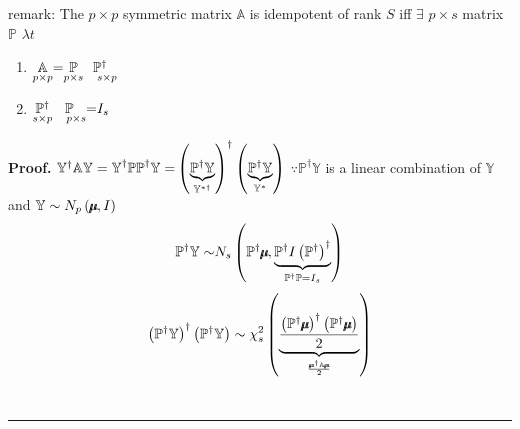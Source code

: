 \documentclass{article}
\newenvironment{proof}[1][Proof]{\noindent\textbf{#1.} }{\ \rule{0.5em}{0.5em}}
\begin{document}
\bigskip

remark: The $p\times p$ symmetric matrix $\mathbb{A}$ is idempotent of rank $%
S$ iff $\exists $ $p\times s$ matrix $\mathbb{P}$ $\lambda t$

\begin{enumerate}
\item $\underset{p\times p}{\mathbb{A}}\mathbb{=}\underset{p\times s}{%
\mathbb{P}}\underset{\quad s\times p}{\mathbb{P}^{\dagger }}$

\item $\underset{s\times p}{\mathbb{P}^{\dagger }}\underset{\quad p\times s}{%
\mathbb{P}}\mathbb{=}I_{s}$
\end{enumerate}

\begin{proof}
$\mathbb{Y}^{\mathbb{\dagger }}\mathbb{AY=Y}^{\mathbb{\dagger }}\mathbb{PP}%
^{\dagger }\mathbb{Y=}\left( \underset{\mathbb{Y}^{\ast \dagger }}{%
\underbrace{\mathbb{P}^{\dagger }\mathbb{Y}}}\right) ^{\dagger }\left( 
\underset{\mathbb{Y}^{\ast }}{\underbrace{\mathbb{P}^{\dagger }\mathbb{Y}}}%
\right) $\newline
\newline
$\because \mathbb{P}^{\dagger }\mathbb{Y}$ is a linear combination of $%
\mathbb{Y}$ and $\mathbb{Y}\sim N_{p}\left( \mathbb{%
\mu\mkern-12.3mu\mu%
},I\right) $%
\begin{equation*}
\therefore \mathbb{P}^{\dagger }\mathbb{Y\sim }N_{s}\left( \mathbb{P}%
^{\dagger }\mathbb{%
\mu\mkern-12.3mu\mu%
},\underset{\mathbb{P}^{\dagger }\mathbb{P}=I_{s}}{\underbrace{\mathbb{P}%
^{\dagger }I\left( \mathbb{P}^{\dagger }\right) ^{\dagger }}}\right) 
\end{equation*}%
\begin{equation*}
\therefore \left( \mathbb{P}^{\dagger }\mathbb{Y}\right) ^{\dagger }\left( 
\mathbb{P}^{\dagger }\mathbb{Y}\right) \sim \chi _{s}^{2}\left( \underset{%
\frac{\mathbb{%
\mu\mkern-12.3mu\mu%
}^{\dagger }\mathbb{A%
\mu\mkern-12.3mu\mu%
}}{2}}{\underbrace{\frac{\left( \mathbb{P}^{\dagger }\mathbb{%
\mu\mkern-12.3mu\mu%
}\right) ^{\dagger }\left( \mathbb{P}^{\dagger }\mathbb{%
\mu\mkern-12.3mu\mu%
}\right) }{2}}}\right) 
\end{equation*}
\end{proof}
\end{document}
